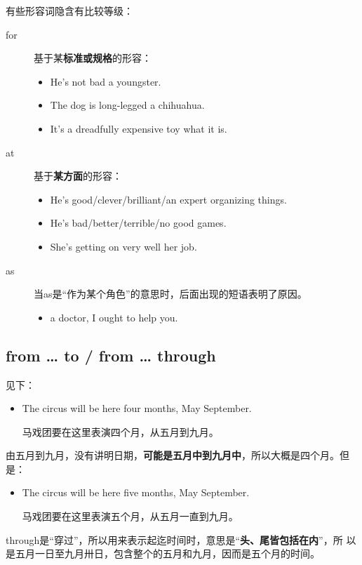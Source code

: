 有些形容词隐含有比较等级：
\begin{description}
\item[for] 基于某\textbf{标准或规格}的形容：
  \begin{itemize}
  \item He's not bad  a youngster.

  \item The dog is long-legged  a chihuahua.
  \item It's a dreadfully expensive toy  what it is.
  \end{itemize}
\item[at] 基于\textbf{某方面}的形容：
  \begin{itemize}
  \item He's good/clever/brilliant/an expert  organizing things.
  \item He's bad/better/terrible/no good  games.
  \item She's getting on very well  her job.
  \end{itemize}

\item[as] 当as是“作为某个角色”的意思时，后面出现的短语表明了原因。
  \begin{itemize}
  \item {} a doctor, I ought to help you.
  \end{itemize}
\end{description}



\subsection{from \ldots{} to / from \ldots{} through}

见下：
\begin{itemize}
\item The circus will be here four months,  May  September.

  马戏团要在这里表演四个月，从五月到九月。
\end{itemize}
由五月到九月，没有讲明日期，\textbf{可能是五月中到九月中}，所以大概是四个月。但
是：
\begin{itemize}
\item The circus will be here five months,  May  September.

  马戏团要在这里表演五个月，从五月一直到九月。
\end{itemize}
through是“穿过”，所以用来表示起迄时间时，意思是“\textbf{头、尾皆包括在内}”，所
以是五月一日至九月卅日，包含整个的五月和九月，因而是五个月的时间。

